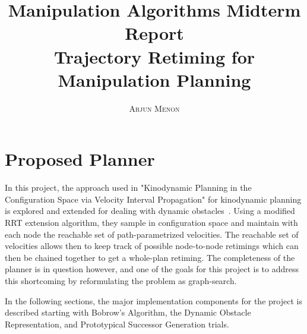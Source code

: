 \documentclass[letterpaper,11pt]{article} %
\title{\textbf{Manipulation Algorithms Midterm Report}\\ %
Trajectory Retiming for Manipulation Planning} %
\author{\textsc{Arjun Menon} %
} %
\makeatletter
\newcommand{\ffig}[3]{
\begin{figure}[h!]
\centering
\texttt{[image: \#1]}
\caption{#2}
\label{fig:#3}
\end{figure}
}
\newif\ifpfig
\renewcommand{\maketitle}{ %
\begin{flushright} %
{\LARGE\@title} %

\vspace{5pt} %

{\large\@author} %
\vspace{0pt} %
\end{flushright}
}
\makeatother
\begin{document}
\maketitle %



%
%
%


\section{Proposed Planner}\label{sec:proposed}

In this project, the approach used in "Kinodynamic Planning in the Configuration Space via Velocity Interval Propagation" for kinodynamic planning is explored and extended for dealing with dynamic obstacles~\cite{pham2013velocity}. Using a modified RRT extension algorithm, they sample in configuration space and maintain with each node the reachable set of path-parametrized velocities. The reachable set of velocities allows then to keep track of possible node-to-node retimings which can then be chained together to get a whole-plan retiming. The completeness of the planner is in question however, and one of the goals for this project is to address this shortcoming by reformulating the problem as graph-search.

In the following sections, the major implementation components for the project is described starting with Bobrow's Algorithm, the Dynamic Obstacle Representation, and Prototypical Successor Generation trials.

\ifpfig
\ffig{pics/dynamic_singularity_pose}{Manipulator's $\mathbb{C}$-space path alongside the configuration of the end-effector at which there is unclear path-acceleration}{dynamic_singularity}
\fi
\end{document}
